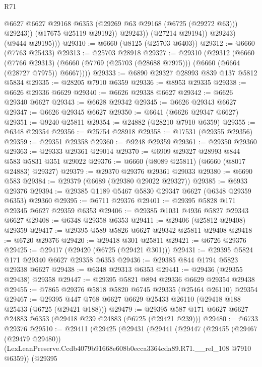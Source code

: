 \begin{lexlean}{R71}
\begin{coremodule}
                      @6627
                      @6627
                      @29168
                      @6353
                      (@29269 @63 @29168 (@6725 (@29272 @63)))
                      @29243))
                  (@17675 @25119 @29192))
                @29243))
            (@27214 @29194))
          @29243)
        (@9444 @29195)))
@29310 := @6660 (@8125 (@25703 @6403))
@29312 := @6660 (@7763 @25433)
@29313 := @25703 @28918
@29327 := @29310
    (@29312
      (@6660
        (@7766 @29313)
        (@6660 (@7769 (@25703 (@28688 @7975))) (@6660 (@6664 (@28727 @7975)) @6667))))
@29333 := @6890 @29327 @28993 @839 @137 @5812 @5834
@29335 := @28205 @7910 @6359
@29336 := @8953 @29335
@29338 := @6626 @29336 @6629
@29340 := @6626 @29338 @6627
@29342 := @6626 @29340 @6627
@29343 := @6628 @29342
@29345 := @6626 @29343 @6627
@29347 := @6626 @29345 @6627
@29350 := @6641 (@6626 @29347 @6627)
@29351 := @9240 @25811
@29354 := @24882 (@28210 @7910 @6359)
@29355 := @6348 @29354
@29356 := @25754 @28918
@29358 := @17531 (@29355 @29356)
@29359 := @29351 @29358
@29360 := @9248 @29359
@29361 := @29350 @29360
@29363 := @29333 @29361 @29014
@29370 := @6909 @29327 @28993 @844 @583 @5831 @351 @29022
@29376 := @6660 (@8089 @25811) (@6660 (@8017 @24883) @29327)
@29379 := @29370 @29376 @29361 @29033
@29380 := @6690 @583
@29384 := @29379 (@6689 (@29380 @29022 @29327))
@29385 := @6933 @29376
@29394 := @29385 @1189 @5467 @5830 @29347 @6627 (@6348 @29359 @6353) @29360
@29395 := @6711 @29376
@29401 := @29395 @5828 @171 @29345 @6627 @29359 @6353
@29406 := @29385 @1031 @4936 @5827 @29343 @6627
@29408 := @6348 @29358 @6353
@29411 := @29406 (@25812 @29408) @29359
@29417 := @29395 @589 @5826 @6627 @29342 @25811 @29408
@29418 := @6720 @29376
@29420 := @29418 @301 @25811
@29421 := @6726 @29376
@29425 := @29417 (@29420 (@6725 (@29421 @301)))
@29431 := @29395 @5824 @171 @29340 @6627 @29358 @6353
@29436 := @29385 @844 @1794 @5823 @29338 @6627
@29438 := @6348 @29313 @6353
@29441 := @29436 (@29355 @29438) @29358
@29447 := @29395 @5821 @894 @29336 @6629 @29354 @29438
@29455 := @7865 @29376 @5818 @5820 @6745 @29335 (@25464 @26110) @29354
@29467 := @29395 @447 @768 @6627 @6629 @25433 @26110 (@29418 @188 @25433 (@6725 (@29421 @188)))
@29479 := @29395 @587 @171 @6627 @6627 @24883 @6353 (@29418 @239 @24883 (@6725 (@29421 @239)))
@29480 := @6733 @29376
@29510 := @29411
    (@29425
      (@29431
        (@29441
          (@29447
            (@29455
              (@29467 (@29479 @29480))
              (LexLeanPreserve.Ccdb4079b91668e608b0ecca3364cda89.R71.__rel_108 @7910 @6359))
            (@29395

\end{coremodule}
\end{lexlean}
